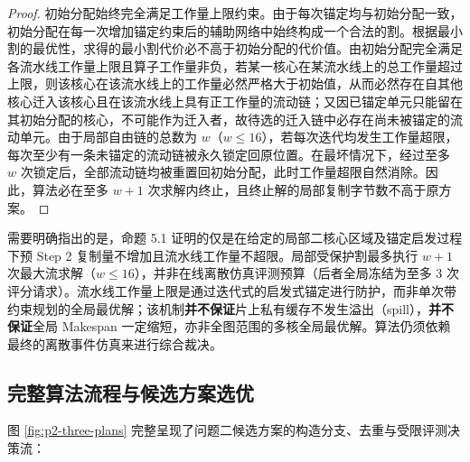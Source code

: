 \documentclass[anonymous,notoc]{gmcm2026}
\begin{document}
\begin{proof} 初始分配始终完全满足工作量上限约束。由于每次锚定均与初始分配一致，初始分配在每一次增加锚定约束后的辅助网络中始终构成一个合法的割。根据最小割的最优性，求得的最小割代价必不高于初始分配的代价值。由初始分配完全满足各流水线工作量上限且算子工作量非负，若某一核心在某流水线上的总工作量超过上限，则该核心在该流水线上的工作量必然严格大于初始值，从而必然存在自其他核心迁入该核心且在该流水线上具有正工作量的流动链；又因已锚定单元只能留在其初始分配的核心，不可能作为迁入者，故待选的迁入链中必存在尚未被锚定的流动单元。由于局部自由链的总数为 \(w\)（\(w \le 16\)），若每次迭代均发生工作量超限，每次至少有一条未锚定的流动链被永久锁定回原位置。在最坏情况下，经过至多 \(w\) 次锁定后，全部流动链均被重置回初始分配，此时工作量超限自然消除。因此，算法必在至多 \(w + 1\) 次求解内终止，且终止解的局部复制字节数不高于原方案。 \end{proof}

需要明确指出的是，命题 5.1 证明的仅是在给定的局部二核心区域及锚定启发过程下预 Step 2 复制量不增加且流水线工作量不超限。局部受保护割最多执行 \(w + 1\) 次最大流求解（\(w \le 16\)），并非在线离散仿真评测预算（后者全局冻结为至多 3 次评分请求）。流水线工作量上限是通过迭代式的启发式锚定进行防护，而非单次带约束规划的全局最优解；该机制\textbf{并不保证}片上私有缓存不发生溢出（spill），\textbf{并不保证}全局 Makespan 一定缩短，亦非全图范围的多核全局最优解。算法仍须依赖最终的离散事件仿真来进行综合裁决。

\subsection{完整算法流程与候选方案选优}

图 \ref{fig:p2-three-plans} 完整呈现了问题二候选方案的构造分支、去重与受限评测决策流：
\end{document}

